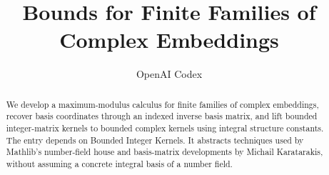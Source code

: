 \documentclass[11pt,a4paper]{article}
\begin{document}
\title{Bounds for Finite Families of Complex Embeddings}
\author{OpenAI Codex}
\maketitle

\begin{abstract}
We develop a maximum-modulus calculus for finite families of complex
embeddings, recover basis coordinates through an indexed inverse basis
matrix, and lift bounded integer-matrix kernels to bounded complex kernels
using integral structure constants. The entry depends on Bounded Integer
Kernels. It abstracts techniques used by Mathlib's number-field house and
basis-matrix developments by Michail Karatarakis, without assuming a
concrete integral basis of a number field.
\end{abstract}


\end{document}

